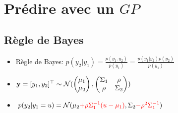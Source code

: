 \documentclass[xcolor=svgnames, t]{beamer}
\newcommand{\vectorx}[1]{\boldsymbol{\MakeLowercase{\mathbf{#1}}}}
\newcommand{\tored}[1]{\textcolor{red}{#1}}
\begin{document}
\section{Prédire avec un $GP$}
\subsection{Règle de Bayes}
\begin{frame}{\subsecname}  
  \begin{itemize}
    \item<1-> Règle de Bayes: %
    $p(y_2| y_1)
    = \frac{p(y_1, y_2)}{p(y_1)}
    = \frac{p(y_1 | y_2) p(y_2)}{p(y_1)}
    $%
    \item<2-> $  \vectorx{y} = [y_1, y_2]^\top \sim \mathcal{N} (
      \begin{pmatrix}
        \mu_1 \\
        \mu_2
      \end{pmatrix},
        \begin{pmatrix}
          \Sigma_{1} & \rho \\
          \rho & \Sigma_{2}
        \end{pmatrix}
    )$%
    \item<3-6> $
    p(y_2 | y_1 = u) = \mathcal{N} (
      \mu_2 \tored{+ \rho \Sigma_1^{-1} (u - \mu_1)},
      \Sigma_2 \tored{- \rho^2 \Sigma_1^{-1}}%
    )$%
  \end{itemize}%
  \begin{figure}
    \centering

\end{figure}
\end{frame}
\end{document}
